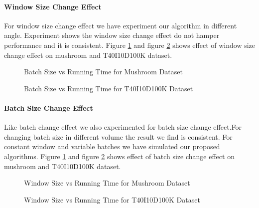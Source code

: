 	\paragraph{Window Size Change Effect}For window size change effect we have experiment our algorithm in different angle. Experiment shows the window size change effect do not hamper performance and it is consistent. Figure \ref{result:g_m_const_batch} and figure \ref{result:g_t10_const_batch} shows effect of window size change effect on mushroom and T40I10D100K dataset.
		\begin{figure}[h]
		\centering
			
		\caption{Batch Size vs Running Time for Mushroom Dataset ~\cite{dataset}}
		\label{result:g_m_const_batch}
		\end{figure}
		\begin{figure}[h]
		\centering
			
		\caption{Batch Size vs Running Time for T40I10D100K Dataset ~\cite{dataset}}
		\label{result:g_t10_const_batch}
		\end{figure}
	\paragraph{Batch Size Change Effect}Like batch change effect we also experimented for batch size change effect.For changing batch size in different volume the result we find is consistent. For constant window and variable batches we have simulated our proposed algorithms. Figure \ref{result:g_m_const_batch} and figure \ref{result:g_t10_const_batch} shows effect of batch size change effect on mushroom and T40I10D100K dataset.
		\begin{figure}[h]
		\centering
			
		\caption{Window Size vs Running Time for Mushroom Dataset ~\cite{dataset}}
		\label{result:g_m_const_win}
		\end{figure}
		\begin{figure}[h]
		\centering
			
		\caption{Window Size vs Running Time for T40I10D100K Dataset ~\cite{dataset}}
		\label{result:g_t10_const_win}
		\end{figure}
\clearpage
